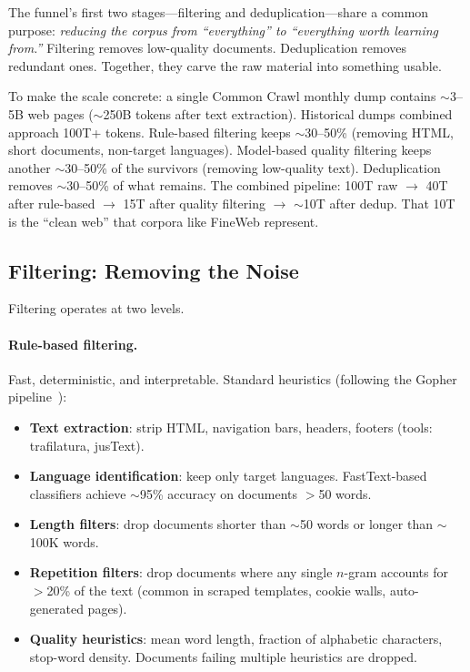 The funnel's first two stages---filtering and deduplication---share a common purpose: \emph{reducing the corpus from ``everything'' to ``everything worth learning from.''} Filtering removes low-quality documents. Deduplication removes redundant ones. Together, they carve the raw material into something usable.

To make the scale concrete: a single Common Crawl monthly dump contains $\sim$3--5B web pages ($\sim$250B tokens after text extraction). Historical dumps combined approach 100T+ tokens. Rule-based filtering keeps $\sim$30--50\% (removing HTML, short documents, non-target languages). Model-based quality filtering keeps another $\sim$30--50\% of the survivors (removing low-quality text). Deduplication removes $\sim$30--50\% of what remains. The combined pipeline: 100T raw $\to$ 40T after rule-based $\to$ 15T after quality filtering $\to$ $\sim$10T after dedup. That 10T is the ``clean web'' that corpora like FineWeb represent.

\subsection{Filtering: Removing the Noise}
\label{sec:filtering}

Filtering operates at two levels.

\paragraph{Rule-based filtering.} Fast, deterministic, and interpretable. Standard heuristics (following the Gopher pipeline~\cite{rae2021gopher}):

\begin{itemize}[nosep]
  \item \textbf{Text extraction}: strip HTML, navigation bars, headers, footers (tools: trafilatura, jusText).
  \item \textbf{Language identification}: keep only target languages. FastText-based classifiers achieve $\sim$95\% accuracy on documents $>$50 words.
  \item \textbf{Length filters}: drop documents shorter than $\sim$50 words or longer than $\sim$100K words.
  \item \textbf{Repetition filters}: drop documents where any single $n$-gram accounts for $>$20\% of the text (common in scraped templates, cookie walls, auto-generated pages).
  \item \textbf{Quality heuristics}: mean word length, fraction of alphabetic characters, stop-word density. Documents failing multiple heuristics are dropped.
\end{itemize}

